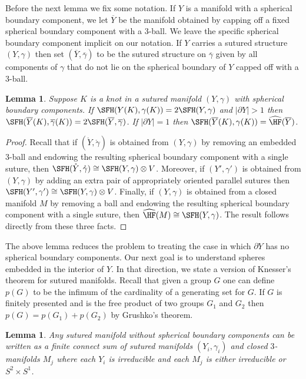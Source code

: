 \documentclass{amsart}
\newtheorem{lemma}[theorem]{Lemma}
\theoremstyle{definition}
\theoremstyle{remark}
\numberwithin{equation}{section}
\begin{document}
Before the next lemma we fix some notation. If $Y$ is a manifold with a spherical boundary component, we let $\overline{Y}$ be the manifold obtained by capping off a fixed spherical boundary component with a $3$-ball. We leave the specific spherical boundary component implicit on our notation. If $Y$ carries a sutured structure $(Y,\gamma)$ then set $(\overline{Y},\overline{\gamma})$ to be the sutured structure on $\overline{\gamma}$ given by all components of $\gamma$ that do not lie on the spherical boundary of $Y$ capped off with a $3$-ball.

\begin{lemma}\label{lem:spericalboundarycase}
    Suppose $K$ is a knot in a sutured manifold $(Y,\gamma)$ with spherical boundary components. If $\SFH(Y(K),\gamma(K))=2\SFH(Y,\gamma)$  and $|\partial Y|>1$ then $\SFH(\overline{Y}(K),\overline{\gamma}(K))=2\SFH(\overline{Y},\overline{\gamma})$. If $|\partial Y|=1$ then $\SFH(\overline{Y}(K),\gamma(K))=\widehat{\HF}(\overline{Y})$.
\end{lemma}
\begin{proof}
    Recall that if $(\mathring{Y},\mathring{\gamma})$ is obtained from $(Y,\gamma)$ by removing an embedded $3$-ball and endowing the resulting spherical boundary component with a single suture, then $\SFH(\mathring{Y},\mathring{\gamma})\cong\SFH(Y,\gamma)\otimes V$. Moreover, if $(Y',\gamma')$ is obtained from $(Y,\gamma)$ by adding an extra pair of appropriately oriented parallel sutures then $\SFH(Y',\gamma')\cong\SFH(Y,\gamma)\otimes V$. Finally, if $(Y,\gamma)$ is obtained from a closed manifold $M$ by removing a ball and endowing the resulting spherical boundary component with a single suture, then $\widehat{\HF}(M)\cong\SFH(Y,\gamma)$. The result follows directly from these three facts.
\end{proof}




The above lemma reduces the problem to treating the case in which $\partial Y$ has no spherical boundary components. Our next goal is to understand spheres embedded in the interior of $Y$. In that direction, we state a version of Knesser's theorem for sutured manifolds. Recall that given a group $G$ one can define $p(G)$ to be the infimum of the cardinality of a generating set for $G$. If $G$ is finitely presented and is the free product of two groups $G_1$ and $G_2$ then $p(G)=p(G_1)+p(G_2)$ by Grushko's theorem.
\begin{lemma}\label{lem:knesser}
    Any sutured manifold without spherical boundary components can be written as a finite connect sum of sutured manifolds $(Y_i,\gamma_i)$ and closed $3$-manifolds $M_j$ where each $Y_i$ is irreducible and each $M_j$ is either irreducible or $S^2\times S^1$.
\end{lemma}
\end{document}
